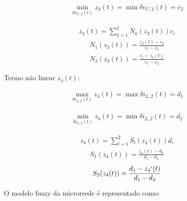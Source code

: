 \begin{gather}
    \min_{\delta v_{C,2}(t)} z_3(t) = \min \delta v_{C,2}(t) = c_2
\end{gather}

\begin{gather*}
    z_3(t) = \sum\limits_{k=1}^{2} N_k(z_3(t))c_i
\end{gather*}
\begin{gather}
    N_1(z_3(t)) = \frac{z_3(t) - c_2}{c_1 - c_2}
\end{gather}
\begin{gather}
    N_2(z_3(t)) = \frac{c_1 - z_3(t)}{c_1 - c_2}
\end{gather}

Termo não linear $z_4(t)$:

\begin{gather*}
    \max_{\delta i_{L,2}(t)} z_4(t) = \max \delta i_{L,2}(t) = d_1
\end{gather*}

\begin{gather}
    \min_{\delta i_{L,2}(t)} z_4(t) = \min \delta i_{L,2}(t) = d_2
\end{gather}

\begin{gather*}
    z_4(t) = \sum\limits_{l=1}^{2} S_l(z_4(t))d_i
\end{gather*}
\begin{gather}
    S_1(z_4(t)) = \frac{z_4(t) - d_2}{d_1 - d_2}
\end{gather}
\begin{gather}
    S_2(z_4(t)) = \frac{d_1 - z_4`(t)}{d_1 - d_2}
\end{gather}

O modelo fuzzy da microrrede é representado como: 

